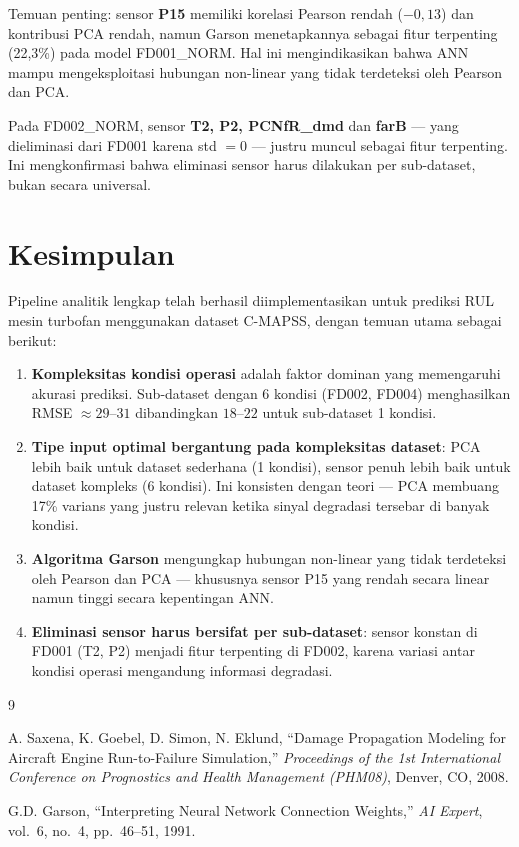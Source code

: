 \documentclass[11pt,a4paper]{article}
\begin{document}
Temuan penting: sensor \textbf{P15} memiliki korelasi Pearson rendah ($-0{,}13$)
dan kontribusi PCA rendah, namun Garson menetapkannya sebagai fitur terpenting
(22,3\%) pada model FD001\_NORM. Hal ini mengindikasikan bahwa ANN mampu
mengeksploitasi hubungan non-linear yang tidak terdeteksi oleh Pearson dan PCA.

Pada FD002\_NORM, sensor \textbf{T2, P2, PCNfR\_dmd} dan \textbf{farB} ---
yang dieliminasi dari FD001 karena std $= 0$ --- justru muncul sebagai fitur
terpenting. Ini mengkonfirmasi bahwa eliminasi sensor harus dilakukan per
sub-dataset, bukan secara universal.

\section{Kesimpulan}

Pipeline analitik lengkap telah berhasil diimplementasikan untuk prediksi RUL
mesin turbofan menggunakan dataset C-MAPSS, dengan temuan utama sebagai berikut:

\begin{enumerate}[noitemsep]
  \item \textbf{Kompleksitas kondisi operasi} adalah faktor dominan yang memengaruhi
    akurasi prediksi. Sub-dataset dengan 6 kondisi (FD002, FD004) menghasilkan RMSE
    $\approx 29$--$31$ dibandingkan $18$--$22$ untuk sub-dataset 1 kondisi.

  \item \textbf{Tipe input optimal bergantung pada kompleksitas dataset}:
    PCA lebih baik untuk dataset sederhana (1 kondisi), sensor penuh lebih baik
    untuk dataset kompleks (6 kondisi). Ini konsisten dengan teori --- PCA
    membuang 17\% varians yang justru relevan ketika sinyal degradasi tersebar
    di banyak kondisi.

  \item \textbf{Algoritma Garson} mengungkap hubungan non-linear yang tidak
    terdeteksi oleh Pearson dan PCA --- khususnya sensor P15 yang rendah secara
    linear namun tinggi secara kepentingan ANN.

  \item \textbf{Eliminasi sensor harus bersifat per sub-dataset}: sensor konstan
    di FD001 (T2, P2) menjadi fitur terpenting di FD002, karena variasi antar
    kondisi operasi mengandung informasi degradasi.
\end{enumerate}

\begin{thebibliography}{9}

  A. Saxena, K. Goebel, D. Simon, N. Eklund,
  ``Damage Propagation Modeling for Aircraft Engine Run-to-Failure Simulation,''
  \textit{Proceedings of the 1st International Conference on Prognostics and
  Health Management (PHM08)}, Denver, CO, 2008.

  G.D. Garson,
  ``Interpreting Neural Network Connection Weights,''
  \textit{AI Expert}, vol.~6, no.~4, pp.~46--51, 1991.

\end{thebibliography}
\end{document}
